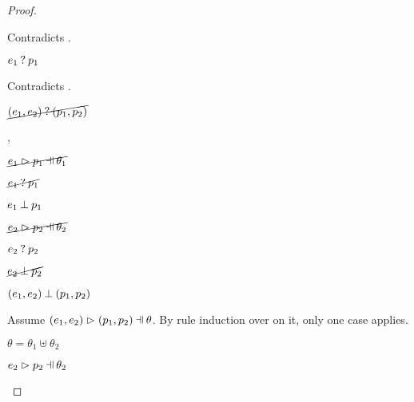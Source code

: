 \begin{proof}
\begin{byCases}
\begin{byCases}
\begin{byCases}
\begin{byCases}
\begin{pfsteps*}
                \end{pfsteps*}
                Contradicts .
            \item[\text{(\ref{rule:MMPair})}]
                \begin{pfsteps*}
                \item $e_1 \mathbin{?} p_1$ 
                \end{pfsteps*}
                Contradicts .
            \end{byCases}
            \begin{pfsteps*}
            \item $\cancel{(e_1 , e_2) \mathbin{?} (p_1 , p_2)}$ 
            \end{pfsteps*}
        \item[\hnotmatch{e_1}{p_1},\hnotmatch{e_2}{p_2}]
            \begin{pfsteps*}
            \item $\cancel{\hpatmatch{e_1}{p_1}{\theta_1}}$  
            \item $\cancel{e_1 \mathbin{?} p_1}$  
            \item $e_1 \mathbin{\bot} p_1$  
            \item $\cancel{\hpatmatch{e_2}{p_2}{\theta_2}}$  
            \item $e_2 \mathbin{?} p_2$  
            \item $\cancel{e_2 \mathbin{\bot} p_2}$  
            \item $(e_1 , e_2) \mathbin{\bot} (p_1 , p_2)$ 
            \end{pfsteps*}
            Assume $\hpatmatch{\hpair{e_1}{e_2}}{\hpair{p_1}{p_2}}{\theta}$. By rule induction over  on it, only one case applies.
            \begin{byCases}
            \item[\text{(\ref{rule:MPair})}]
                \begin{pfsteps*}
                \item $\theta=\theta_1\uplus\theta_2$
                \item $\hpatmatch{e_2}{p_2}{\theta_2}$ 

\end{pfsteps*}
\end{byCases}
\end{byCases}
\end{byCases}
\end{byCases}
\end{proof}
